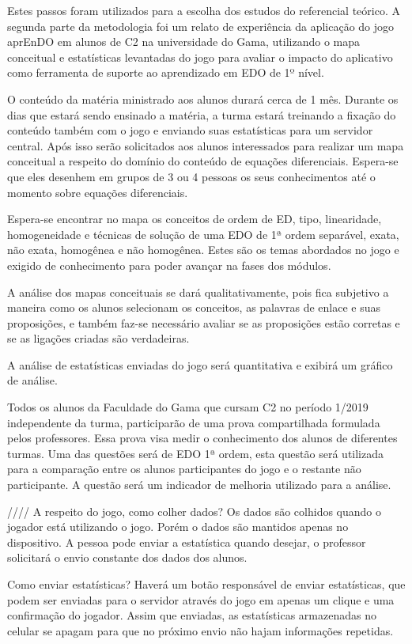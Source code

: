 Estes passos foram utilizados para a escolha dos estudos do referencial teórico.
A segunda parte da metodologia foi um relato de experiência da aplicação do jogo aprEnDO em alunos de C2 na universidade do Gama, utilizando o mapa conceitual e estatísticas levantadas do jogo para avaliar o impacto do aplicativo como ferramenta de suporte ao aprendizado em EDO de 1º nível.

O conteúdo da matéria ministrado aos alunos durará cerca de 1 mês. Durante os dias que estará sendo ensinado a matéria, a turma estará treinando a fixação do conteúdo também com o jogo e enviando suas estatísticas para um servidor central. Após isso serão solicitados aos alunos interessados para realizar um mapa conceitual a respeito do domínio do conteúdo de equações diferenciais. Espera-se que eles desenhem em grupos de 3 ou 4 pessoas os seus conhecimentos até o momento sobre equações diferenciais. 

Espera-se encontrar no mapa os conceitos de ordem de ED, tipo, linearidade, homogeneidade e técnicas de solução de uma EDO de 1ª ordem separável, exata, não exata, homogênea e não homogênea. Estes são os temas abordados no jogo e exigido de conhecimento para poder avançar na fases dos módulos.

A análise dos mapas conceituais se dará qualitativamente, pois fica subjetivo a maneira como os alunos selecionam os conceitos, as palavras de enlace e suas proposições, e também faz-se necessário avaliar se as proposições estão corretas e se as ligações criadas são verdadeiras.

A análise de estatísticas enviadas do jogo será quantitativa e exibirá um gráfico de análise. 

Todos os alunos da Faculdade do Gama que cursam C2 no período 1/2019 independente da turma, participarão de uma prova compartilhada formulada pelos professores. Essa prova visa medir o conhecimento dos alunos de diferentes turmas. Uma das questões será de EDO 1ª ordem, esta questão será utilizada para a comparação entre os alunos participantes do jogo e o restante não participante. A questão será um indicador de melhoria utilizado para a análise.

////
A respeito do jogo, como colher dados? Os dados são colhidos quando o jogador está utilizando o jogo. Porém o dados são mantidos apenas no dispositivo. A pessoa pode enviar a estatística quando desejar, o professor solicitará o envio constante dos dados dos alunos.

Como enviar estatísticas? Haverá um botão responsável de enviar estatísticas, que podem ser enviadas para o servidor através do jogo em apenas um clique e uma confirmação do jogador. Assim que enviadas, as estatísticas armazenadas no celular se apagam para que no próximo envio não hajam informações repetidas.

